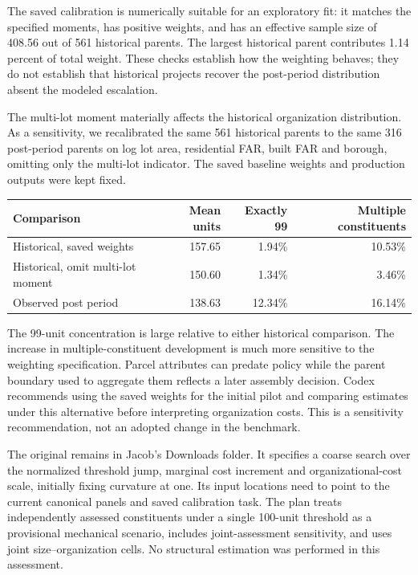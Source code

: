 The saved calibration is numerically suitable for an exploratory fit: it
matches the specified moments, has positive weights, and has an effective
sample size of 408.56 out of 561 historical parents. The largest historical
parent contributes 1.14 percent of total weight. These checks establish how
the weighting behaves; they do not establish that historical projects recover
the post-period distribution absent the modeled escalation.

The multi-lot moment materially affects the historical organization
distribution. As a sensitivity, we recalibrated the same 561 historical
parents to the same 316 post-period parents on log lot area, residential FAR,
built FAR and borough, omitting only the multi-lot indicator. The saved
baseline weights and production outputs were kept fixed.

\begin{center}
\small
\begin{tabular}{lrrr}
\hline
Comparison & Mean units & Exactly 99 & Multiple constituents \\
\hline
Historical, saved weights & 157.65 & 1.94\% & 10.53\% \\
Historical, omit multi-lot moment & 150.60 & 1.34\% & 3.46\% \\
Observed post period & 138.63 & 12.34\% & 16.14\% \\
\hline
\end{tabular}
\end{center}

The 99-unit concentration is large relative to either historical comparison.
The increase in multiple-constituent development is much more sensitive to
the weighting specification. Parcel attributes can predate policy while the
parent boundary used to aggregate them reflects a later assembly decision.
Codex recommends using the saved weights for the initial pilot and comparing
estimates under this alternative before interpreting organization costs.
This is a sensitivity recommendation, not an adopted change in the benchmark.

The original  remains in Jacob's Downloads folder.
It specifies a coarse search over the normalized threshold jump, marginal
cost increment and organizational-cost scale, initially fixing curvature at
one. Its input locations need to point to the current canonical panels and
saved calibration task. The plan treats independently assessed constituents
under a single 100-unit threshold as a provisional mechanical scenario,
includes joint-assessment sensitivity, and uses joint size--organization
cells. No structural estimation was performed in this assessment.


